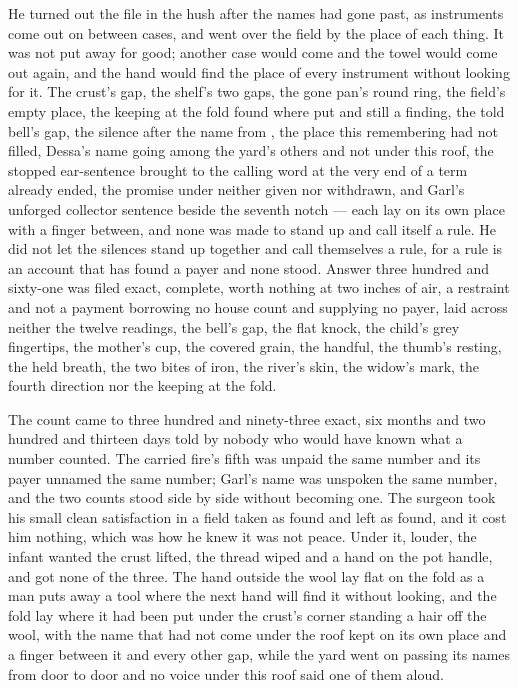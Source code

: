 \scenebreak

He turned out the file in the hush after the names had gone past, as instruments come out on  between cases, and went over the field by the place of each thing. It was not put away for good; another case would come and the towel would come out again, and the hand would find the place of every instrument without looking for it. The crust's gap, the shelf's two gaps, the gone pan's round ring, the field's empty place, the keeping at the fold found where put and still a finding, the told bell's gap, the silence after the name from , the place this remembering had not filled, Dessa's name going among the yard's others and not under this roof, the stopped ear-sentence brought to the calling word at the very end of a term already ended, the promise under  neither given nor withdrawn, and Garl's unforged collector sentence beside the seventh notch --- each lay on its own place with a finger between, and none was made to stand up and call itself a rule. He did not let the silences stand up together and call themselves a rule, for a rule is an account that has found a payer and none stood. Answer three hundred and sixty-one was filed exact, complete, worth nothing at two inches of air, a restraint and not a payment borrowing no house count and supplying no payer, laid across neither the twelve readings, the bell's gap, the flat knock, the child's grey fingertips, the mother's cup, the covered grain, the handful, the thumb's resting, the held breath, the two bites of iron, the river's skin, the widow's mark, the fourth direction nor the keeping at the fold.

The count came to three hundred and ninety-three exact, six months and two hundred and thirteen days told by nobody who would have known what a number counted. The carried fire's fifth was unpaid the same number and its payer unnamed the same number; Garl's name was unspoken the same number, and the two counts stood side by side without becoming one. The surgeon took his small clean satisfaction in a field taken as found and left as found, and it cost him nothing, which was how he knew it was not peace. Under it, louder, the infant wanted the crust lifted, the thread wiped and a hand on the pot handle, and got none of the three. The hand outside the wool lay flat on the fold as a man puts away a tool where the next hand will find it without looking, and the fold lay where it had been put under the crust's corner standing a hair off the wool, with the name that had not come under the roof kept on its own place and a finger between it and every other gap, while the yard went on passing its names from door to door and no voice under this roof said one of them aloud.
